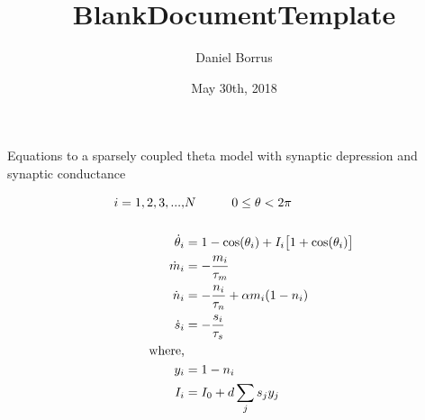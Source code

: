 \documentclass[preview]{standalone}	%
\title{BlankDocumentTemplate}
\date{May 30th, 2018}
\author{Daniel Borrus}
\begin{document}
\centering
Equations to a sparsely coupled theta model with synaptic depression and synaptic conductance

\begin{align*}
i = 1,2,3,...,&N  \hskip1cm 0\leq\theta<2\pi \\
\\
\dot{\theta}_i&= 1-\cos(\theta_i) + I_i \big[1+\cos(\theta_i)\big] \\
\dot{m}_i&= - \frac{m_i}{\tau_m} \\
\dot{n}_i&= - \frac{n_i}{\tau_n} + \alpha m_i (1-n_i) \\
\dot{s}_i&= - \frac{s_i}{\tau_s} \\
\text{where,}& \\
y_i &= 1-n_i \\
I_i&=I_0+d\sum_j s_j y_j
\end{align*}
\end{document}
